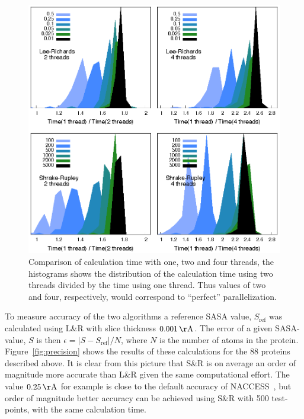 \documentclass[a4paper,11pt]{article}
\begin{document}
\begin{figure}
  \begin{center}
  \includegraphics{fig/threads} 
  \caption{Comparison of calculation time with one, two and four
    threads, the histograms shows the distribution of the calculation
    time using two threads divided by the time using one thread. Thus
    values of two and four, respectively, would correspond to
    ``perfect'' parallelization.
    \label{fig:threads}}
  \end{center}
\end{figure}

To measure accuracy of the two algorithms a reference SASA value,
$S_\text{ref}$ was calculated using L\&R with slice thickness
$0.001\,\mathrm{\AA}$. The error of a given SASA-value, $S$ is then
$\epsilon = \lvert S - S_\text{ref} \rvert / N$, where $N$ is the
number of atoms in the protein. Figure~\ref{fig:precision} shows the
results of these calculations for the 88 proteins described above.  It
is clear from this picture that S\&R is on average an order of
magnitude more accurate than L\&R given the same computational effort.
The value $0.25\,\mathrm{\AA}$ for example is close to the default
accuracy of NACCESS~\cite{NACCESS,NACCESSParam}, but order of
magnitude better accuracy can be achieved using S\&R with 500
test-points, with the same calculation time.
\end{document}
